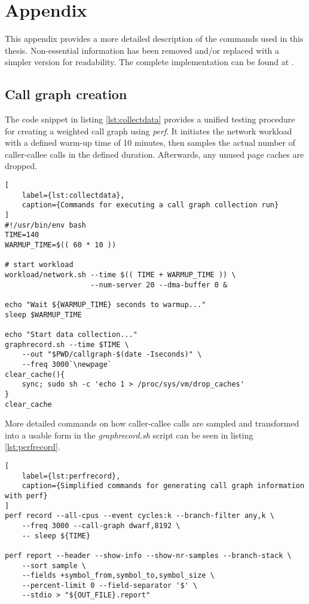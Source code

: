 \chapter*{Appendix}\label{appendix:implement}

This appendix provides a more detailed description of the commands used in this thesis. Non-essential information has been removed and/or replaced with a simpler version for readability. The complete implementation can be found at \cite{github}.

\section{Call graph creation}\label{appendix:callgraph}

The code snippet in listing \ref{lst:collectdata} provides a unified testing procedure for creating a weighted call graph using \textit{perf}. It initiates the network workload with a defined warm-up time of 10 minutes, then samples the actual number of caller-callee calls in the defined duration. Afterwards, any unused page caches are dropped.

\vspace{.5\baselineskip}
\begin{lstlisting}[
    label={lst:collectdata},
    caption={Commands for executing a call graph collection run}
]
#!/usr/bin/env bash
TIME=140
WARMUP_TIME=$(( 60 * 10 ))

# start workload
workload/network.sh --time $(( TIME + WARMUP_TIME )) \
                    --num-server 20 --dma-buffer 0 &

echo "Wait ${WARMUP_TIME} seconds to warmup..."
sleep $WARMUP_TIME

echo "Start data collection..."
graphrecord.sh --time $TIME \
    --out "$PWD/callgraph-$(date -Iseconds)" \
    --freq 3000`\newpage`
clear_cache(){
    sync; sudo sh -c 'echo 1 > /proc/sys/vm/drop_caches'
}
clear_cache
\end{lstlisting}

More detailed commands on how caller-callee calls are sampled and transformed into a usable form in the \textit{graphrecord.sh} script can be seen in listing \ref{lst:perfrecord}.

\vspace{.5\baselineskip}
\begin{lstlisting}[
    label={lst:perfrecord},
    caption={Simplified commands for generating call graph information with perf}
]
perf record --all-cpus --event cycles:k --branch-filter any,k \
    --freq 3000 --call-graph dwarf,8192 \
    -- sleep ${TIME}

perf report --header --show-info --show-nr-samples --branch-stack \
    --sort sample \
    --fields +symbol_from,symbol_to,symbol_size \
    --percent-limit 0 --field-separator '$' \
    --stdio > "${OUT_FILE}.report"
\end{lstlisting}

